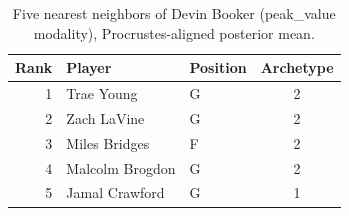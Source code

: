 \begin{table}[htbp]
  \centering\small
  \begin{tabular}{rllc}
    \toprule
    Rank & Player & Position & Archetype \\
    \midrule
    1 & Trae Young & G & 2 \\
    2 & Zach LaVine & G & 2 \\
    3 & Miles Bridges & F & 2 \\
    4 & Malcolm Brogdon & G & 2 \\
    5 & Jamal Crawford & G & 1 \\
    \bottomrule
  \end{tabular}
  \caption{Five nearest neighbors of Devin Booker (peak_value modality), Procrustes-aligned posterior mean.}
  \label{tab:Devin_Booker_neighbors_peak_value}
\end{table}

